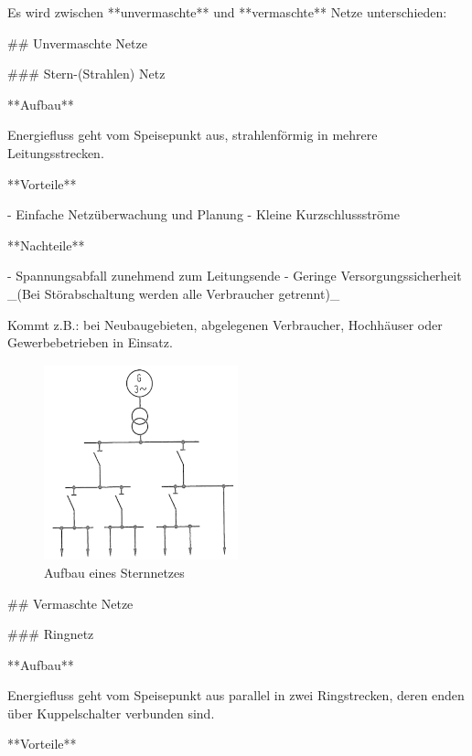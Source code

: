 \begin{markdown}

Es wird zwischen **unvermaschte** und **vermaschte** Netze unterschieden:

\vspace{1em}

## Unvermaschte Netze

### Stern-(Strahlen) Netz

**Aufbau**

Energiefluss geht vom Speisepunkt aus, strahlenförmig in mehrere Leitungsstrecken.

**Vorteile**

- Einfache Netzüberwachung und Planung
- Kleine Kurzschlussströme

**Nachteile**

- Spannungsabfall zunehmend zum Leitungsende
- Geringe Versorgungssicherheit _(Bei Störabschaltung werden alle Verbraucher getrennt)_

Kommt z.B.: bei Neubaugebieten, abgelegenen Verbraucher, Hochhäuser oder Gewerbebetrieben in Einsatz.

\begin{figure}[H]
    \centering
    \includegraphics[width=0.5\textwidth]{./images/01-Netze/Sternnetz.png}
    \caption[Aufbau eines Stern-(Strahlen) Netzes]{Aufbau eines Sternnetzes}
\end{figure}

\newpage

## Vermaschte Netze

### Ringnetz

**Aufbau**

Energiefluss geht vom Speisepunkt aus parallel in zwei Ringstrecken, deren enden über Kuppelschalter verbunden sind.

**Vorteile**


\end{markdown}
